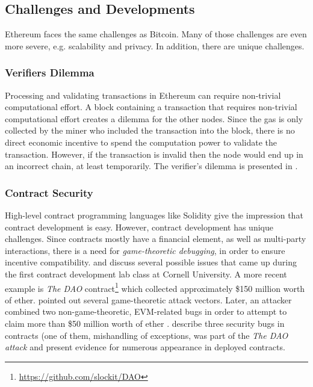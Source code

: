 \subsection{Challenges and Developments}

Ethereum faces the same challenges as Bitcoin. Many of those challenges are even more severe, e.g. scalability and privacy. In addition, there are unique challenges.

\subsubsection{Verifiers Dilemma}
Processing and validating transactions in Ethereum can require non-trivial computational effort.
A block containing a transaction that requires non-trivial computational effort creates a dilemma for the other nodes. Since the gas is only collected by the miner who included the transaction into the block, there is no direct economic incentive to spend the computation power to validate the transaction. However, if the transaction is invalid then the node would end up in an incorrect chain, at least temporarily.
The verifier's dilemma is presented in \parencite{Luu:2015:DIC:2810103.2813659}.

\subsubsection{Contract Security}

High-level contract programming languages like Solidity give the impression that contract development is easy. However, contract development has unique challenges. Since contracts mostly have a financial element, as well as multi-party interactions, there is a need for \emph{game-theoretic debugging}, in order to ensure incentive compatibility. \cite{delmolino2015programmer} and \cite{delmolino2015step} discuss several possible issues that came up during the first contract development lab class at Cornell University. A more recent example is \emph{The DAO} contract\footnote{\url{https://github.com/slockit/DAO}} which collected approximately \$150 million worth of ether. \cite{mark2016} pointed out several game-theoretic attack vectors. Later, an attacker combined two non-game-theoretic, \ac{EVM}-related bugs in order to attempt to claim more than \$50 million worth of ether \parencite{daian2016dao}. \cite{cryptoeprint:2016:633} describe three security bugs in contracts (one of them, mishandling of exceptions, was part of the \emph{The DAO attack} and present evidence for numerous appearance in deployed contracts.


